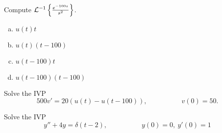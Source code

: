 \begin{applicationActivities}
\begin{activity}{5}
Compute \(\mathcal{L}^{-1} \left\{ \frac{e^{-100s}}{s^2}\right\} \).
\begin{enumerate}[(a)]
\item \(u(t)t\)
\item \(u(t)(t-100)\)
\item \(u(t-100)t\)
\item \(u(t-100)(t-100)\)
\end{enumerate}
\end{activity}



\begin{activity}{15}
Solve the IVP
\[ 500v' = 20 \left( u(t)-u(t-100)\right), \hspace{5em} v(0)=50.\]
\end{activity}

\begin{activity}{15}
Solve the IVP
\[y''+4y=\delta(t-2), \hspace{5em} y(0)=0,\ y'(0)=1\]
\end{activity}



\end{applicationActivities}
